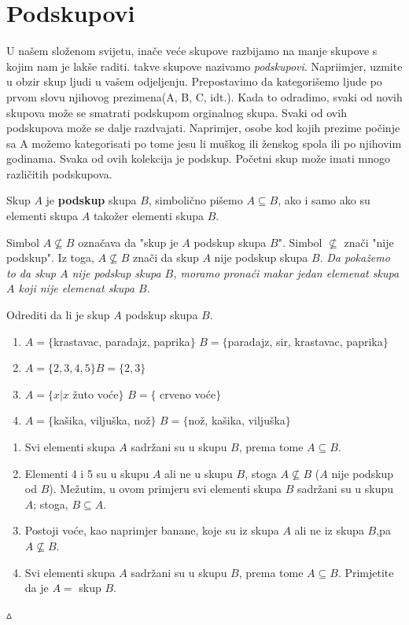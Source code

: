 \documentclass[a4paper,14pt,svgnames]{article}
\newcounter{counter}
\newcommand{\examplecounter}{\textbf{\refstepcounter{counter}PRIMJER \thecounter}}
\newcommand{\example}[3]{\begin{tcolorbox}[title=\large \examplecounter \hfill\small\textbf{"#1"}]
#2
\begin{tcolorbox}[title=\small \textbf{RJEŠENJE},colback=white]
\begin{center}
#3

\vspace{0.5em}\hfill $\vartriangle$
\end{center}
\end{tcolorbox}
\end{tcolorbox}}
\begin{document}
\newpage
\section{Podskupovi}
U našem složenom svijetu, inače veće skupove razbijamo na manje skupove s kojim nam je lakše raditi. takve skupove nazivamo \textit{podskupovi}. Napriimjer, uzmite u obzir skup ljudi u vašem odjeljenju. Prepostavimo da kategorišemo ljude po prvom slovu njihovog prezimena(A, B, C, idt.). Kada to odradimo, svaki od novih skupova može se smatrati podskupom orginalnog skupa. Svaki od ovih podskupova može se dalje  razdvajati. Naprimjer, osobe kod kojih prezime počinje sa A možemo kategorisati po tome jesu li muškog ili ženskog spola ili po njihovim godinama. Svaka od ovih kolekcija je podskup. Početni skup može imati mnogo različitih podskupova.
\begin{tcolorbox}
Skup $A$ je \textbf{podskup} skupa $B$, simbolično pišemo $A\subseteq B$, ako i samo ako su elementi skupa $A$ takožer elementi skupa $B$.
\end{tcolorbox}

Simbol $A\nsubseteq B$ označava da "skup je $A$ podskup skupa $B$". Simbol $\nsubseteq$ znači "nije podskup". Iz toga, $A\nsubseteq B$ znači da skup $A$ nije podskup skupa $B$. \textit{Da pokažemo to da skup $A$ nije podskup skupa $B$, moramo pronaći makar jedan elemenat skupa $A$ koji nije elemenat skupa $B$.}

\example{Da li je $A$ podskup?}{Odrediti da li je skup $A$ podskup skupa $B$.
\begin{enumerate}[label=\alph*),leftmargin=0.5cm]
\item $A=\{$krastavac, paradajz, paprika$\}$
$B=\{$paradajz, sir, krastavac, paprika$\}$
\item $A=\{2, 3, 4, 5\}$\quad $B=\{2, 3\}$
\item $A=\{x|x$ žuto voće$\}$
$B=\{$ crveno voće$\}$
\item $A=\{$kašika, viljuška, nož$\}$
$B=\{$nož, kašika, viljuška$\}$
\end{enumerate}}{%
{\begin{enumerate}[label=\alph*),leftmargin=0.5cm]
\item Svi elementi skupa $A$ sadržani su u skupu $B$, prema tome $A\subseteq B$.
\item Elementi 4 i 5 su u skupu $A$ ali ne u skupu $B$, stoga $A\nsubseteq B$ ($A$ nije podskup od $B$). Mežutim, u ovom primjeru svi elementi skupa $B$ sadržani su u skupu $A$; stoga, $B\subseteq A$.
\item Postoji voće, kao naprimjer banane, koje su iz skupa $A$ ali ne iz skupa $B$,pa $A\nsubseteq B$.
\item Svi elementi skupa $A$ sadržani su u skupu $B$, prema tome $A\subseteq B$. Primjetite da je $A=$ skup $B$.
\end{enumerate}}}
\end{document}
